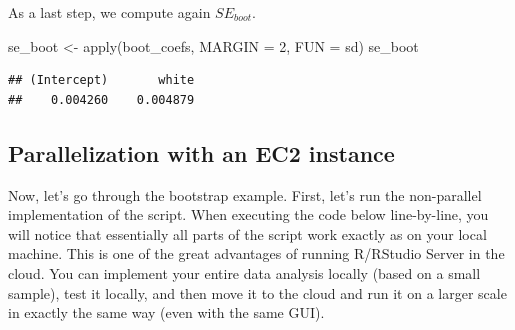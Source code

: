 \documentclass[
  12pt,
]{style/krantz}
\newenvironment{Shaded}{\begin{snugshade}}{\end{snugshade}}
\newcommand{\AttributeTok}[1]{\textcolor[rgb]{0.77,0.63,0.00}{#1}}
\newcommand{\DecValTok}[1]{\textcolor[rgb]{0.00,0.00,0.81}{#1}}
\newcommand{\FunctionTok}[1]{\textcolor[rgb]{0.00,0.00,0.00}{#1}}
\newcommand{\NormalTok}[1]{#1}
\newcommand{\OtherTok}[1]{\textcolor[rgb]{0.56,0.35,0.01}{#1}}
\begin{document}
As a last step, we compute again \(SE_{boot}\).

\begin{Shaded}
\begin{Highlighting}[]
\NormalTok{se\_boot }\OtherTok{\textless{}{-}} \FunctionTok{apply}\NormalTok{(boot\_coefs, }
                 \AttributeTok{MARGIN =} \DecValTok{2}\NormalTok{,}
                 \AttributeTok{FUN =}\NormalTok{ sd)}
\NormalTok{se\_boot}
\end{Highlighting}
\end{Shaded}

\begin{verbatim}
## (Intercept)       white 
##    0.004260    0.004879
\end{verbatim}

\hypertarget{parallelization-with-an-ec2-instance-1}{%
\subsection{Parallelization with an EC2 instance}\label{parallelization-with-an-ec2-instance-1}}

Now, let's go through the bootstrap example. First, let's run the non-parallel implementation of the script. When executing the code below line-by-line, you will notice that essentially all parts of the script work exactly as on your local machine. This is one of the great advantages of running R/RStudio Server in the cloud. You can implement your entire data analysis locally (based on a small sample), test it locally, and then move it to the cloud and run it on a larger scale in exactly the same way (even with the same GUI).
\end{document}

